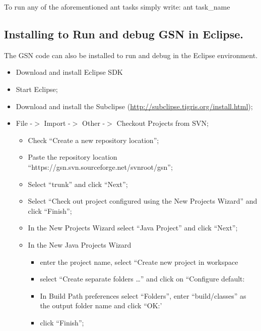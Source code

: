{\footnotesize To run any of the aforementioned ant tasks simply
write: ant task\_name}

\subsection{Installing to Run and debug GSN in Eclipse.}

The GSN code can also be installed to run and debug in the Eclipse
environment.

\begin{itemize}
	\item Download and install Eclipse SDK
	\item Start Eclipse;
	\item Download and install the Subclipse
(\url{http://subclipse.tigris.org/install.html});
	\item File -\begin{math}>\end{math} Import -\begin{math}>\end{math} Other
-\begin{math}>\end{math} Checkout Projects from SVN;
\begin{itemize}
	\item Check \textquotedblleft{}Create a new repository
location\textquotedblright{};
	\item Paste the repository location
\textquotedblleft{}https://gsn.svn.sourceforge.net/svnroot/gsn\textquotedblright{};
	\item Select \textquotedblleft{}trunk\textquotedblright{} and click
\textquotedblleft{}Next\textquotedblright{};
	\item Select \textquotedblleft{}Check out project configured using the New
Projects Wizard\textquotedblright{} and click
\textquotedblleft{}Finish\textquotedblright{};
	\item In the New Projects Wizard select \textquotedblleft{}Java
Project\textquotedblright{} and click
\textquotedblleft{}Next\textquotedblright{};
	\item In the New Java Projects Wizard
\begin{itemize}
	\item enter the project name, select \textquotedblleft{}Create new project
in workspace
	\item select \textquotedblleft{}Create separate folders
\ldots{}\textquotedblright{} and click on \textquotedblleft{}Configure
default:
	\item In Build Path preferences select
\textquotedblleft{}Folders\textquotedblright{}, enter
\textquotedblleft{}build/classes\textquotedblright{} as the output
folder name and click \textquotedblleft{}OK:'
	\item click \textquotedblleft{}Finish\textquotedblright{};
\end{itemize}


\end{itemize}
\end{itemize}
